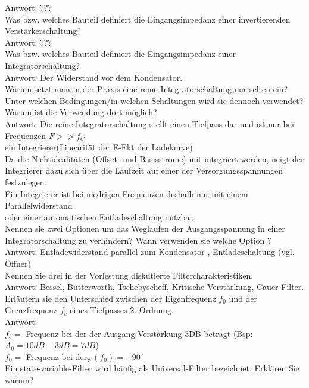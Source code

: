 \documentclass[A4]{scrreprt}
\begin{document}
  \bigskip Antwort: ???\\
  Was bzw. welches Bauteil definiert die Eingangsimpedanz einer invertierenden Verstärkerschaltung?\\
  \bigskip Antwort: ???\\
  Was bzw. welches Bauteil definiert die Eingangsimpedanz einer Integratorschaltung?\\
  \bigskip Antwort: Der Widerstand vor dem Kondensator.\\
  Warum setzt man in der Praxis eine reine Integratorschaltung nur selten ein? Unter welchen Bedingungen/in welchen Schaltungen wird sie dennoch verwendet? 
  Warum ist die Verwendung dort möglich?\\
  Antwort: Die reine Integratorschaltung stellt einen Tiefpass dar und ist nur bei Frequenzen $F >> f_C$\\
  ein Integrierer(Linearität der E-Fkt der Ladekurve)\\
  Da die Nichtidealitäten (Offset- und Basisströme) mit integriert werden, neigt der Integrierer dazu sich über die Laufzeit auf einer der Versorgungsspannungen festzulegen.\\
  Ein Integrierer ist bei niedrigen Frequenzen deshalb nur mit einem Parallelwiderstand\\
  \bigskip oder einer automatischen Entladeschaltung nutzbar.\\
  Nennen sie zwei Optionen um das Weglaufen der Ausgangsspannung in einer Integratorschaltung zu verhindern? Wann verwenden sie welche Option ?\\
  \bigskip Antwort: Entladewiderstand parallel zum Kondensator , Entladeschaltung (vgl. Öffner)\\
  Nennen Sie drei in der Vorlestung diskutierte Filtercharakteristiken.\\
  \bigskip Antwort: Bessel, Butterworth, Tschebyscheff, Kritische Verstärkung, Cauer-Filter.\\
  Erläutern sie den Unterschied zwischen der Eigenfrequenz $f_0$ und der Grenzfrequenz $f_c$ eines Tiefpasses 2. Ordnung.\\
  Antwort:\\
  $f_c = $ Frequenz bei der der Ausgang Verstärkung-3DB beträgt (Bsp: $A_0 = 10dB - 3dB = 7dB $)\\
  \bigskip $f_0 = $ Frequenz bei der$\varphi(f_0) = -90^\circ$\\
  Ein state-variable-Filter wird häufig als Universal-Filter bezeichnet. Erklären Sie warum?\\
\end{document}
